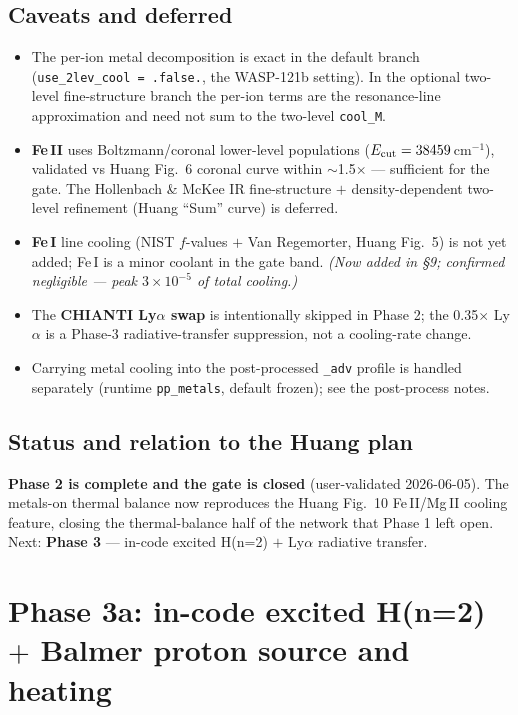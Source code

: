 \documentclass[english,a4paper]{kiseon_memo}
\begin{document}
\subsection{Caveats and deferred}
\begin{itemize}
  \item The per-ion metal decomposition is exact in the default branch
    (\verb|use_2lev_cool = .false.|, the WASP-121b setting). In the optional
    two-level fine-structure branch the per-ion terms are the resonance-line
    approximation and need not sum to the two-level \verb|cool_M|.
  \item \textbf{Fe\,II} uses Boltzmann/coronal lower-level populations
    (\(E_{\rm cut}=38459\)\,cm\(^{-1}\)), validated vs Huang Fig.~6 coronal curve
    within \(\sim\)1.5\(\times\) --- sufficient for the gate. The
    Hollenbach \& McKee IR fine-structure $+$ density-dependent two-level
    refinement (Huang ``Sum'' curve) is deferred.
  \item \textbf{Fe\,I} line cooling (NIST $f$-values $+$ Van Regemorter,
    Huang Fig.~5) is not yet added; Fe\,I is a minor coolant in the gate band.
    \emph{(Now added in \S9; confirmed negligible --- peak \(3\times10^{-5}\) of
    total cooling.)}
  \item The \textbf{CHIANTI Ly\(\alpha\) swap} is intentionally skipped in
    Phase 2; the 0.35\(\times\) Ly\(\alpha\) is a Phase-3 radiative-transfer
    suppression, not a cooling-rate change.
  \item Carrying metal cooling into the post-processed \texttt{\_adv} profile is
    handled separately (runtime \verb|pp_metals|, default frozen); see the
    post-process notes.
\end{itemize}

\subsection{Status and relation to the Huang plan}

\textbf{Phase 2 is complete and the gate is closed} (user-validated 2026-06-05).
The metals-on thermal balance now reproduces the Huang Fig.~10 Fe\,II/Mg\,II
cooling feature, closing the thermal-balance half of the network that Phase 1
left open. Next: \textbf{Phase 3} --- in-code excited H(n=2) $+$ Ly\(\alpha\)
radiative transfer.

\section{Phase 3a: in-code excited H(n=2) $+$ Balmer proton source and heating}
\end{document}
